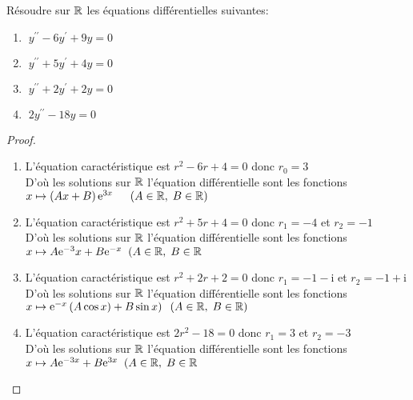  
\begin{exercice}
 Résoudre sur $ \mathbb{R} $  les  équations différentielles suivantes:
 \begin{enumerate}
  \item $ \; y^{\prime \prime}-6y^{\prime}+9y=0 $
 \item $ \; y^{\prime \prime}+ 5y^{\prime}+4y=0 $
 \item $  \; y^{\prime \prime}+2 y^{\prime}+2y=0 $
 \item $ \; 2 y^{\prime \prime}-18y=0 $
 \end{enumerate}
\end{exercice}
 
\begin{proof}
 \begin{enumerate}
  \item
 L'équation caractéristique est $ r^{2}-6r+4=0 $ donc $ r_{0}=3 $\\D'où  les solutions sur $ \mathbb{R} $ l'équation différentielle sont les fonctions\; $ x\mapsto \left(Ax+B\right)\mathrm{e}^{3x}\quad  \;\;(A\in\mathbb{R},\; B\in\mathbb{R}) $\\
   \item L'équation caractéristique est $ r^{2}+5r+4=0 $ donc $ r_{1}=-4 $  et $ r_{2} =-1$\\D'où  les solutions sur $ \mathbb{R} $ l'équation différentielle sont les fonctions\; $ x\mapsto A\mathrm{e}^{-3}x+B\mathrm{e}^{-x} \;\;(A\in\mathbb{R},\; B\in\mathbb{R} $\\
 
   \item L'équation caractéristique est $ r^{2}+2r+2=0 $ donc $ r_{1}=-1-\mathrm{i} $  et $ r_{2} =-1+ \mathrm{i} $\\D'où  les solutions sur $ \mathbb{R} $ l'équation différentielle sont les fonctions\; $ x\mapsto \mathrm{e}^{- x}\left( A\cos x)+B\sin x\right) \;\;(A\in\mathbb{R},\; B\in\mathbb{R}) $\\
  \item L'équation caractéristique est $ 2r^{2}-18=0 $ donc $ r_{1}=3 $  et $ r_{2} =-3$\\D'où  les solutions sur $ \mathbb{R} $ l'équation différentielle sont les fonctions\; $ x\mapsto A\mathrm{e}^{-3x}+B\mathrm{e}^{ 3x} \;\;(A\in\mathbb{R},\; B\in\mathbb{R} $
 \end{enumerate}
 \end{proof}
